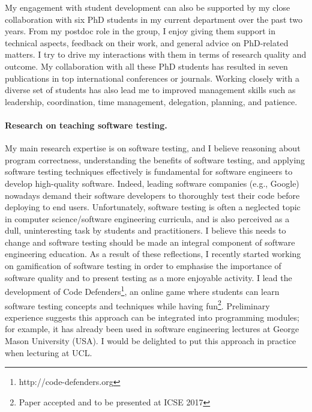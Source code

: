 \documentclass[a4paper]{article}
\begin{document}
My engagement with student development can also be supported by my
close collaboration with six PhD students in my current department
over the past two years. From my postdoc role in the group, I enjoy
giving them support in technical aspects, feedback on their work, and
general advice on PhD-related matters. I try to drive my interactions
with them in terms of research quality and outcome. My collaboration
with all these PhD students has resulted in seven publications in top
international conferences or journals. Working closely with a diverse
set of students has also lead me to improved management skills such as
leadership, coordination, time management, delegation, planning, and
patience.

\paragraph{Research on teaching software testing.} My main research
expertise is on software testing, and I believe reasoning about
program correctness, understanding the benefits of software testing,
and applying software testing techniques effectively is fundamental
for software engineers to develop high-quality software. Indeed,
leading software companies (e.g., Google) nowadays demand their
software developers to thoroughly test their code before deploying to
end users.  Unfortunately, software testing is often a neglected topic
in computer science/software engineering curricula, and is also
perceived as a dull, uninteresting task by students and
practitioners. I believe this needs to change and software testing
should be made an integral component of software engineering
education. As a result of these reflections, I recently started
working on gamification of software testing in order to emphasise the
importance of software quality and to present testing as a more
enjoyable activity. I lead the development of Code
Defenders\footnote{http://code-defenders.org}, an online game where
students can learn software testing concepts and techniques while
having fun\footnote{Paper accepted and to be presented at ICSE
  2017}. Preliminary experience suggests this approach can be
integrated into programming modules; for example, it has already been
used in software engineering lectures at George Mason University
(USA). I would be delighted to put this approach in practice when
lecturing at UCL.

\end{document}
